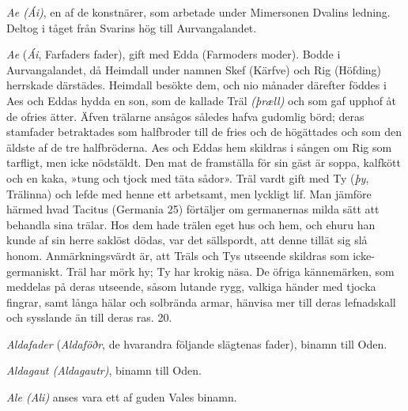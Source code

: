 \emph{Ae (Ái)}, en af de konstnärer, som arbetade under Mimersonen
Dvalins ledning. Deltog i tåget från Svarins hög till Aurvangalandet.

\emph{Ae} (\emph{Ái}, Farfaders fader), gift med Edda (Farmoders moder).
Bodde i Aurvangalandet, då Heimdall under namnen Skef (Kärfve) och Rig
(Höfding) herrskade därstädes. Heimdall besökte dem, och nio månader
därefter föddes i Aes och Eddas hydda en son, som de kallade Träl
\emph{(þræll)} och som gaf upphof åt de ofries ätter. Äfven trälarne
ansågos således hafva gudomlig börd; deras stamfader betraktades som
halfbroder till de fries och de högättades och som den äldste af de tre
halfbröderna. Aes och Eddas hem skildras i sången om Rig som tarfligt,
men icke nödstäldt. Den mat de framställa för sin gäst är soppa,
kalfkött och en kaka, »tung och tjock med täta sådor». Träl vardt gift
med Ty (\emph{þy}, Trälinna) och lefde med henne ett arbetsamt, men
lyckligt lif. Man jämföre härmed hvad Tacitus (Germania 25) förtäljer om
germanernas milda sätt att behandla sina trälar. Hos dem hade trälen
eget hus och hem, och ehuru han kunde af sin herre saklöst dödas, var
det sällspordt, att denne tillät sig slå honom. Anmärkningsvärdt är, att
Träls och Tys utseende skildras som icke-germaniskt. Träl har mörk hy;
Ty har krokig näsa. De öfriga kännemärken, som meddelas på deras
utseende, såsom lutande rygg, valkiga händer med tjocka fingrar, samt
långa hälar och solbrända armar, hänvisa mer till deras lefnadskall och
sysslande än till deras ras. 20.

\emph{Aldafader} (\emph{Aldaföðr}, de hvarandra följande slägtenas
fader), binamn till Oden.

\emph{Aldagaut (Aldagautr)}, binamn till Oden.

\protect\hypertarget{lb1625905.xhtmlux5cux23start199}{}{}\protect\hypertarget{lb1625905.xhtmlux5cux23start199-a}{}{}\protect\hypertarget{lb1625905.xhtmlux5cux23start199-b}{}{}\protect\hypertarget{lb1625905.xhtmlux5cux23start199-c}{}{}\protect\hypertarget{lb1625905.xhtmlux5cux23start199-d}{}{}

\emph{Ale (Ali)} anses vara ett af guden Vales binamn.

